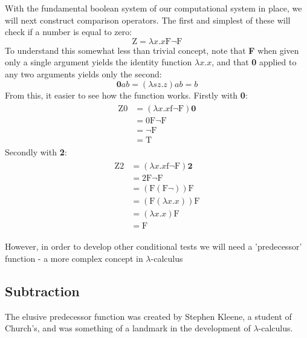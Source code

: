 \documentclass[Master.tex]{subfiles}
\begin{document}
With the fundamental boolean system of our computational system in place, we will next construct comparison operators. The first and simplest of these will check if a number is equal to zero:
\begin{equation*}
\bm{\mathrm{Z}} = \lambda x.x\bm{\mathrm{F\lnot F}}
\end{equation*}
To understand this somewhat less than trivial concept, note that \textbf{F} when given only a single argument yields the identity function $\lambda x.x$, and that \textbf{0} applied to any two arguments yields only the second:
\begin{equation*}
\bm{0}ab = (\lambda sz.z)ab = b
\end{equation*}
From this, it easier to see how the function works. Firstly with \textbf{0}:
\begin{gather*}
\begin{aligned}
\bm{\mathrm{Z0}} &= (\lambda x.x\bm{\mathrm{f\lnot F}})\bm{0}\\
&= \bm{\mathrm{0F\lnot F}}\\
&= \bm{\mathrm{\lnot F}}\\
&= \bm{\mathrm{T}}
\end{aligned}
\end{gather*}
Secondly with \textbf{2}:
\begin{gather*}
\begin{aligned}
\bm{\mathrm{Z2}} &= (\lambda x.x\bm{\mathrm{f\lnot F}})\bm{2}\\
&= \bm{\mathrm{2F\lnot F}}\\
&= (\bm{\mathrm{F}}(\bm{\mathrm{F}}\lnot)) \bm{\mathrm{F}}\\
&= (\bm{\mathrm{F}}(\lambda x.x))\bm{\mathrm{F}}\\
&= (\lambda x.x)\bm{\mathrm{F}}\\
&= \bm{\mathrm{F}} 
\end{aligned}
\end{gather*}

However, in order to develop other conditional tests we will need a 'predecessor' function - a more complex concept in $\lambda$-calculus
\subsection{Subtraction}

The elusive predecessor function was created by Stephen Kleene, a student of Church's, and was something of a landmark in the development of $\lambda$-calculus.
\end{document}
